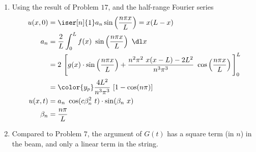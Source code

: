 \begin{enumerate}
    \item Using the result of Problem $ 17 $, and the half-range Fourier series
          \begin{align}
              u(x, 0) & = \iser[n]{1} a_n \sin\left( \frac{n\pi x}{L}
              \right) = x(L - x)                                                     \\
              a_n     & = \frac{2}{L} \int_{0}^{L} f(x)\ \sin\left( \frac{n\pi x}{L}
              \right)\ \dl x                                                         \\
                      & = 2\ \Bigg[ g(x) \cdot \sin\left( \frac{n\pi x}{L}
                  \right) + \frac{n^2 \pi^2\ x(x - L) - 2L^2}{n^3 \pi^3}\ \cos\left(
              \frac{n\pi x}{L} \right) \Bigg]_0^L                                    \\
                      & = \color{y_p} \frac{4L^2}{n^3 \pi^3}\ [1 - \cos(n \pi)]      \\
              u(x, t) & = a_n\ \cos(c\beta_n^2\ t)
              \cdot \sin(\beta_n\ x)                                                 \\
              \beta_n & = \frac{n\pi}{L}
          \end{align}

    \item Compared to Problem $ 7 $, the argument of $ G(t) $ has a square term
          (in $ n $) in the beam, and only a linear term in the string.


\end{enumerate}
